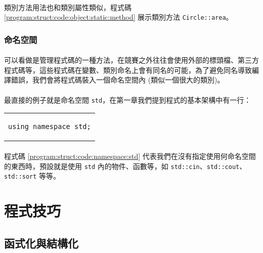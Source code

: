 \documentclass[12pt,a4paper,oneside]{report}
\begin{document}
\begin{CJK}{UTF8}{bkai}
\paragraph{}類別方法用法也和類別屬性類似，程式碼 \ref{program:struct:code:object:static:method} 展示類別方法 \lstinline!Circle::area!。

\subsubsection{命名空間}

\paragraph{} 可以看做是管理程式碼的一種方法，在競賽之外往往會使用外部的標頭檔、第三方程式碼等，這些程式碼在變數、類別命名上會有同名的可能，為了避免同名導致編譯錯誤，我們會將程式碼裝入一個命名空間內 (類似一個很大的類別)。
\paragraph{}最直接的例子就是命名空間 \lstinline!std!，在第一章我們提到程式的基本架構中有一行：

\begin{code}[h!]
\centering
\begin{tabular}{c}
\begin{lstlisting}
using namespace std;
\end{lstlisting}
\end{tabular}
\caption{預設 \lstinline!std! 命名空間}
\label{program:struct:code:namespace:std}
\end{code}

\paragraph{}程式碼 \ref{program:struct:code:namespace:std} 代表我們在沒有指定使用何命名空間的東西時，預設就是使用 \lstinline!std! 內的物件、函數等，如 \lstinline!std::cin!、\lstinline!std::cout!、\lstinline!std::sort! 等等。

\section{程式技巧}
\subsection{函式化與結構化}


\end{CJK}
\end{document}
